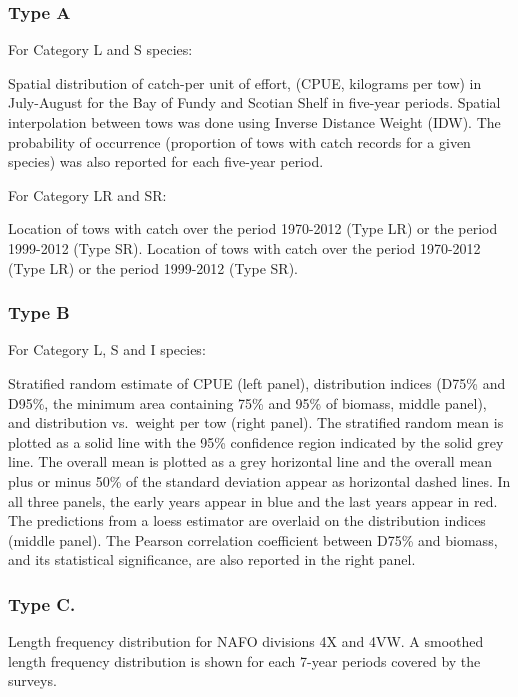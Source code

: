 \documentclass[12pt]{article}\usepackage[]{graphicx}\usepackage[]{color}
\begin{document}
\hypertarget{type-a}{%
\subsubsection{Type A}\label{type-a}}

For Category L and S species:

Spatial distribution of catch-per unit of effort, (CPUE, kilograms per tow) in July-August for the Bay of Fundy and Scotian Shelf in five-year periods. Spatial interpolation between tows was done using Inverse Distance Weight (IDW). The probability of occurrence (proportion of tows with catch records for a given species) was also reported for each five-year period.

For Category LR and SR:

Location of tows with catch over the period 1970-2012 (Type LR) or the period 1999-2012 (Type SR). Location of tows with catch over the period 1970-2012 (Type LR) or the period 1999-2012 (Type SR).

\hypertarget{type-b}{%
\subsubsection{Type B}\label{type-b}}

For Category L, S and I species:

Stratified random estimate of CPUE (left panel), distribution indices (D75\% and D95\%, the minimum area containing 75\% and 95\% of biomass, middle panel), and distribution vs.~weight per tow (right panel). The stratified random mean is plotted as a solid line with the 95\% confidence region indicated by the solid grey line. The overall mean is plotted as a grey horizontal line and the overall mean plus or minus 50\% of the standard deviation appear as horizontal dashed lines. In all three panels, the early years appear in blue and the last years appear in red. The predictions from a loess estimator are overlaid on the distribution indices (middle panel). The Pearson correlation coefficient between D75\% and biomass, and its statistical significance, are also reported in the right panel.

\hypertarget{type-c.}{%
\subsubsection{Type C.}\label{type-c.}}

Length frequency distribution for NAFO divisions 4X and 4VW. A smoothed length frequency distribution is shown for each 7-year periods covered by the surveys.
\end{document}

